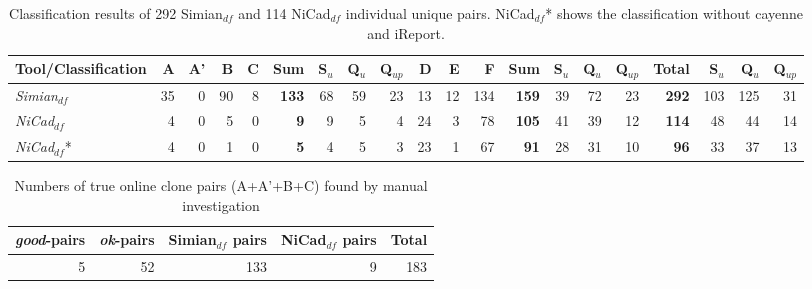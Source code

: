 \documentclass{IEEEtran}
\begin{document}
\begin{table}[H]
	\centering
	\caption{Classification results of 292 Simian$_{\mathrm{\textit{df}}}$ and 114 NiCad$_{\mathrm{\textit{df}}}$ individual unique pairs. NiCad$_{\mathrm{\textit{df}}}$* shows the classification without cayenne and iReport.}
	\label{tab:classification_indv}
	\begin{tabular}{|l|r|r|r|r|r|r|r|r|r|r|r|r|r|r|r|r|r|r|r|}
		\hline 
		Tool/Classification & A & A' & B & C & \textbf{Sum} & S$_{u}$ & Q$_{u}$ & Q$_{up}$ & D & E & F & \textbf{Sum}  & S$_{u}$ & Q$_{u}$ & Q$_{up}$ & \textbf{Total} & S$_{u}$ & Q$_{u}$  & Q$_{up}$  \\ 
		\hline 
		\multirow{1}{*}{\textit{Simian$_{\mathrm{\textit{df}}}$}} & 35 & 0 & 90 & 8 & \textbf{133} & 68 & 59 & 23 & 13 & 12 & 134 & \textbf{159} & 39 & 72 & 23 & \textbf{292} & 103 & 125 & 31 \\
		\hline
		\multirow{1}{*}{\textit{NiCad$_{\mathrm{\textit{df}}}$}} & 4  & 0 & 5 & 0 & \textbf{9} & 9 & 5 & 4 & 24 & 3 & 78 & \textbf{105} & 41 & 39 & 12 & \textbf{114} & 48 & 44 & 14 \\ 
		\hline
		\multirow{1}{*}{\textit{NiCad$_{\mathrm{\textit{df}}}$}*} & 4  & 0 & 1 & 0 & \textbf{5} & 4 & 5 & 3 & 23 & 1 & 67 & \textbf{91} & 28 & 31 & 10 & \textbf{96} & 33 & 37 & 13 \\ 
		\hline
	\end{tabular} 
\end{table}

\begin{table}[H]
	\centering
	\caption{Numbers of true online clone pairs (A+A'+B+C) found by manual investigation}
	\label{tab:classification_indv_summary}
	\begin{tabular}{r|r|r|r|r}
		\hline 
		\textit{good}-pairs & \textit{ok}-pairs & Simian$_{\mathrm{\textit{df}}}$ pairs & NiCad$_{\mathrm{\textit{df}}}$ pairs & Total \\ 
		\hline 
		5 & 52 & 133 & 9 & 183 \\
		\hline
	\end{tabular} 
\end{table}

\end{document}
